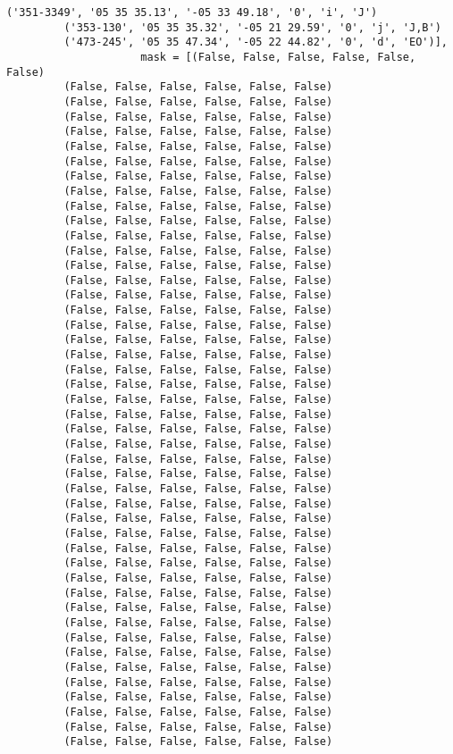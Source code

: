 \documentclass{article}
\begin{document}
\begin{Verbatim}[commandchars=\\\{\}]
         ('351-3349', '05 35 35.13', '-05 33 49.18', '0', 'i', 'J')
         ('353-130', '05 35 35.32', '-05 21 29.59', '0', 'j', 'J,B')
         ('473-245', '05 35 47.34', '-05 22 44.82', '0', 'd', 'EO')],
                     mask = [(False, False, False, False, False, False)
         (False, False, False, False, False, False)
         (False, False, False, False, False, False)
         (False, False, False, False, False, False)
         (False, False, False, False, False, False)
         (False, False, False, False, False, False)
         (False, False, False, False, False, False)
         (False, False, False, False, False, False)
         (False, False, False, False, False, False)
         (False, False, False, False, False, False)
         (False, False, False, False, False, False)
         (False, False, False, False, False, False)
         (False, False, False, False, False, False)
         (False, False, False, False, False, False)
         (False, False, False, False, False, False)
         (False, False, False, False, False, False)
         (False, False, False, False, False, False)
         (False, False, False, False, False, False)
         (False, False, False, False, False, False)
         (False, False, False, False, False, False)
         (False, False, False, False, False, False)
         (False, False, False, False, False, False)
         (False, False, False, False, False, False)
         (False, False, False, False, False, False)
         (False, False, False, False, False, False)
         (False, False, False, False, False, False)
         (False, False, False, False, False, False)
         (False, False, False, False, False, False)
         (False, False, False, False, False, False)
         (False, False, False, False, False, False)
         (False, False, False, False, False, False)
         (False, False, False, False, False, False)
         (False, False, False, False, False, False)
         (False, False, False, False, False, False)
         (False, False, False, False, False, False)
         (False, False, False, False, False, False)
         (False, False, False, False, False, False)
         (False, False, False, False, False, False)
         (False, False, False, False, False, False)
         (False, False, False, False, False, False)
         (False, False, False, False, False, False)
         (False, False, False, False, False, False)
         (False, False, False, False, False, False)
         (False, False, False, False, False, False)
         (False, False, False, False, False, False)
         (False, False, False, False, False, False)

\end{Verbatim}
\end{document}
